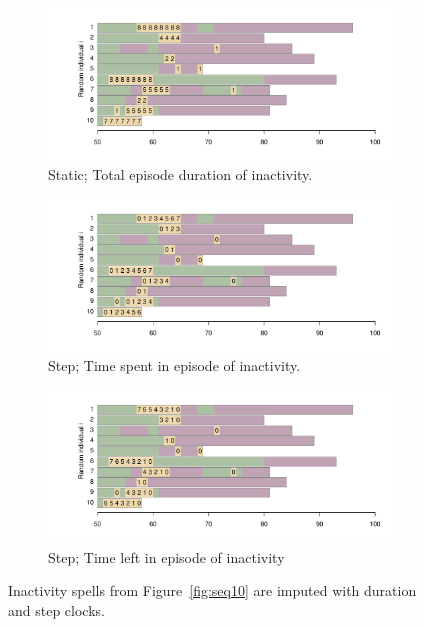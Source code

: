 \documentclass{article}
\begin{document}
\begin{figure}[ht!]
\centering

\begin{subfigure}{\textwidth}
\includegraphics[scale=.5]{Figures/Seq10dur.pdf}
\caption{Static; Total episode duration of inactivity.}
\label{fig:seq10dur}
\end{subfigure}

\begin{subfigure}{\textwidth}
\includegraphics[scale=.5]{Figures/Seq10timespent.pdf}
\caption{Step; Time spent in episode of inactivity.}
\label{fig:seq10timespent}
\end{subfigure}

\begin{subfigure}{\textwidth}
\includegraphics[scale=.5]{Figures/Seq10timeleft.pdf}
\caption{Step; Time left in episode of inactivity}
\label{fig:seq10timeleft}
\end{subfigure}
\caption{Inactivity spells from Figure~\ref{fig:seq10}
are imputed with duration and step clocks.}
\label{fig:spentleft}
\end{figure}
\end{document}

